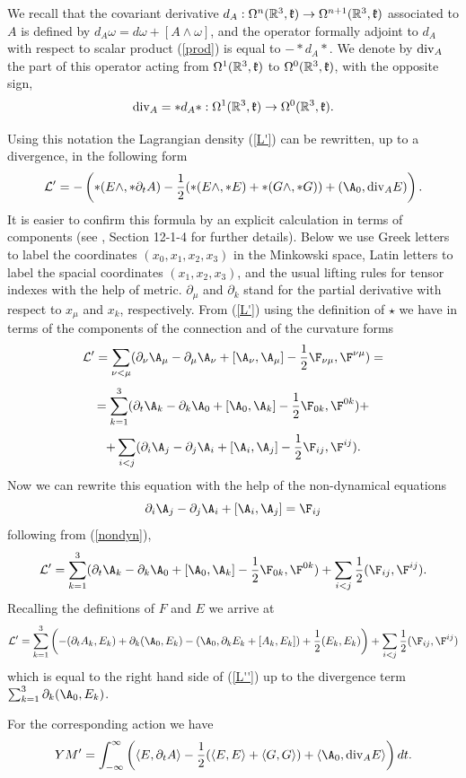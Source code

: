 \documentclass{amsart}
\begin{document}
We recall that the covariant derivative
$d_A:\Omega^n(\mathbb{R}^{3},\mathfrak k)\rightarrow \Omega^{n+1}(\mathbb{R}^{3},\mathfrak k)$ associated to $A$
is defined by $d_A\omega =d\omega + [A\wedge \omega]$, and the operator
formally adjoint to $d_A$ with respect to scalar product (\ref{prod}) is
equal to $-*d_A*$. We denote by ${\rm div}_A$ the part of this operator acting
from $\Omega^1(\mathbb{R}^{3},\mathfrak k)$ to $\Omega^{0}(\mathbb{R}^{3},\mathfrak k)$, with
the opposite sign,
$$
{\rm div}_A=*d_A*:\Omega^1(\mathbb{R}^{3},\mathfrak k)\rightarrow
\Omega^{0}(\mathbb{R}^{3},\mathfrak k).
$$

Using this notation the Lagrangian density (\ref{L'}) can be rewritten, up to a divergence, in
the following form
\begin{equation}\label{L''}
\mathcal{L}'=-\left( *(E\wedge,*\partial_t A)-\frac 12 (*(E\wedge,*E)+*(G\wedge,*G))+(\A_0,{\rm div}_A
E)\right).
\end{equation}
It is easier to confirm this formula by an explicit calculation in terms of components (see \cite{IZ}, Section 12-1-4 for further details). Below we use Greek letters to label the coordinates $(x_0,x_1,x_2,x_3)$ in the Minkowski space, Latin letters to label the spacial coordinates $(x_1,x_2,x_3)$, and the usual lifting rules for tensor indexes with the help of metric. $\partial_\mu$ and $\partial_k$ stand for the partial derivative with respect to $x_\mu$ and $x_k$, respectively.
From (\ref{L'}) using the definition of $\star$ we have in terms of the components of the connection and of the curvature forms
$$
\mathcal{L}'= \sum_{\nu<\mu}(\partial_\nu \A_\mu-\partial_\mu \A_\nu+[\A_\nu,\A_\mu]-\frac12\F_{\nu\mu}, \F^{\nu\mu})=
$$
$$
=\sum_{k=1}^3(\partial_t \A_k-\partial_k \A_0+[\A_0,\A_k]-\frac12\F_{0k}, \F^{0k})+
$$
$$
+\sum_{i<j}(\partial_i \A_j-\partial_j \A_i+[\A_i,\A_j]-\frac12\F_{ij}, \F^{ij}).
$$
Now we can rewrite this equation with the help of the non-dynamical equations
$$
\partial_i \A_j-\partial_j \A_i+[\A_i,\A_j]=\F_{ij}
$$
following from (\ref{nondyn}),
$$
\mathcal{L}'
=\sum_{k=1}^3(\partial_t \A_k-\partial_k \A_0+[\A_0,\A_k]-\frac12\F_{0k}, \F^{0k})
+\sum_{i<j}\frac12(\F_{ij}, \F^{ij}).
$$
Recalling the definitions of $F$ and $E$ we arrive at
$$
\mathcal{L}'
=\sum_{k=1}^3\left(-(\partial_t A_k, E_k)+\partial_k (\A_0,E_k)-(\A_0,\partial_k E_k+[A_k,E_k])+\frac12(E_k, E_k)\right)+\sum_{i<j}\frac12(\F_{ij}, \F^{ij})
$$
which is equal to the right hand side of (\ref{L''}) up to the divergence term $\sum_{k=1}^3\partial_k (\A_0,E_k)$.

For the corresponding action we have
\begin{equation}\label{YM''}
 YM'=\int_{-\infty}^{\infty}\left( \langle E,\partial_t A\rangle -\frac 12 (\langle E,E\rangle +\langle G,G\rangle )+\langle \A_0,{\rm div}_A
E\rangle \right) dt.
\end{equation}
\end{document}
